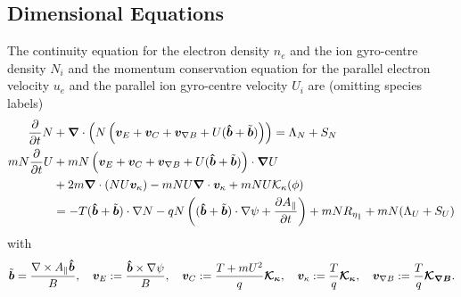 \subsection{Dimensional Equations}
The continuity equation for the electron density \(n_e\) and the ion gyro-centre
density \(N_i\) and the momentum conservation equation for
the parallel electron velocity \(u_e\) and the parallel ion gyro-centre velocity \(U_i\) are
(omitting species labels)~\cite{WiesenbergerPhD, HeldPhD}
\begin{align}
\frac{\partial}{\partial t} N &+ {\boldsymbol{\nabla}}\cdot\left( N \left(
    {\boldsymbol{v}}_E + {\boldsymbol{v}}_C + {\boldsymbol{v}}_{\nabla B} + U(\bm{\hat{b}} + \tilde{{\boldsymbol{b}}})\right)\right) = \Lambda_N + S_N \\
mN \frac{\partial}{\partial t} U &+ mN \left(
    {\boldsymbol{v}}_E + {\boldsymbol{v}}_C + {\boldsymbol{v}}_{\nabla B} + U(\bm{\hat{b}} + \tilde{{\boldsymbol{b}}})
    \right)\cdot {\boldsymbol{\nabla}} U  \nonumber \\
    &+ 2m{\boldsymbol{\nabla}} \cdot ( NU {\boldsymbol{v}}_\kappa)
    -mNU{\boldsymbol{\nabla}}\cdot {\boldsymbol{v}}_\kappa
    + mNU\mathcal K_\kappa(\phi) \nonumber\\
    &= -T (\bm{\hat{b}} + \tilde{{\boldsymbol{b}}})\cdot \nabla N -qN \left( (\bm{\hat{b}}+\tilde{{\boldsymbol{b}}})\cdot \nabla \psi + \frac{\partial A_\parallel}{\partial t}\right) + mN R_{\eta_\parallel} + mN(\Lambda_U + S_U)
\label{}
\end{align}
with
\begin{align}
\tilde{{\boldsymbol{b}}} = \frac{\nabla\times A_\parallel \bm{\hat{b}}}{B}, \quad
{\boldsymbol{v}}_E := \frac{\bm{\hat{b}}\times\nabla\psi}{B},\quad
{\boldsymbol{v}}_C := \frac{T+mU^2}{q}{\boldsymbol{\mathcal K_\kappa}},\quad
{\boldsymbol{v}}_\kappa := \frac{T}{q}{\boldsymbol{\mathcal K_\kappa}},\quad
{\boldsymbol{v}}_{\nabla B} := \frac{T}{q}{\boldsymbol{\mathcal K_{\nabla B}}}.
\label{}
\end{align}

